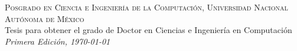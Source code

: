 \vfill
\thispagestyle{empty}

\noindent \textsc{Posgrado en Ciencia e Ingeniería de la Computación,
Universidad Nacional Autónoma de México}\\

\noindent Tesis para obtener el grado de Doctor en Ciencias e
Ingeniería en Computación\\
\noindent \textit{Primera Edición, \today}
